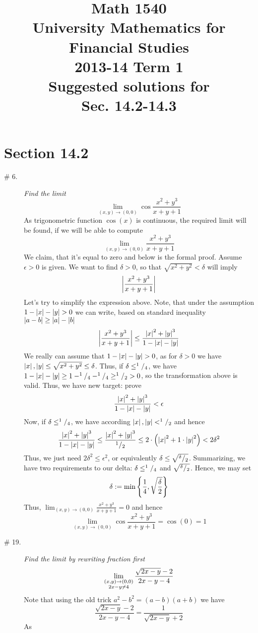 \documentclass[8pt]{article} %
\title{Math 1540\\University Mathematics for Financial Studies\\2013-14 Term 1\\Suggested solutions for\\
Sec. 14.2-14.3}
\begin{document}
\maketitle
\section{Section 14.2}
\begin{description}
	\item[\# 6.]{{\it Find the limit}\[\lim_{(x,y)\to(0,0)}\cos\frac{x^2+y^3}{x+y+1}\]
		}
		As trigonometric function $\cos(x)$ is continuous, the required limit will be found, if we will be able to compute
		\[\lim_{(x,y)\to(0,0)}\frac{x^2+y^3}{x+y+1}\]
		We claim, that it's equal to zero and below is the formal proof. Assume $\epsilon>0$ is given. We want to find $
		\delta>0$, so that $\sqrt{x^2+y^2}<\delta$ will imply
		\[\left|\frac{x^2+y^3}{x+y+1}\right|\]
		Let's try to simplify the expression above. Note, that under the assumption $1-\myabs{x}-\myabs{y}>0$ we can write,
		based on standard inequality $\left|a-b\right|\geq\left|a\right|-\left|b\right|$
		\[\left|\frac{x^2+y^3}{x+y+1}\right|\leq\frac{\left|x\right|^2+\left|y\right|^3}{1-\left|x\right|-\left|y\right|}\]
		We really can assume that $1-\myabs{x}-\myabs{y}>0$, as for $\delta>0$ we have $\left|x\right|,\left|y\right|\leq\sqrt{x^2+
		y^2}\leq\delta$. Thus, if $\delta\leq^{1}/_{4}$, we have $1-\left|x\right|-\left|y\right|\geq 1-^{1}/_{4}-^{1}/_{4}
		\geq^{1}/_{2}>0$, so the transformation above is valid. Thus, we have new target: prove
		\[\frac{\left|x\right|^2+\left|y\right|^3}{1-\left|x\right|-\left|y\right|}<\epsilon\]
		Now, if $\delta\leq^{1}/_{4}$, we have according $\left|x\right|,\left|y\right|<^{1}/_{2}$ and hence
		\[\frac{\left|x\right|^2+\left|y\right|^3}{1-\left|x\right|-\left|y\right|}\leq
		\frac{\left|x\right|^2+\left|y\right|^3}{^{1}/_{2}}\leq2\cdot\left(\left|x\right|^2+1\cdot\left|y\right|^2\right)<2\delta^2\]
		Thus, we just need $2\delta^2\leq\epsilon^2$, or equivalently $\delta\leq\sqrt{^{\delta}/_{2}}$. Summarizing,
		we have two requirements to our delta: $\delta\leq^{1}/_{4}$ and $\sqrt{^{\delta}/_{2}}$. Hence, we may set
		\[\delta:=\min\mycbra{\frac{1}{4},\sqrt{\frac{\delta}{2}}}\]
		Thus, $\lim_{(x,y)\to(0,0)}\frac{x^2+y^3}{x+y+1}=0$ and hence
		\[\lim_{(x,y)\to(0,0)}\cos\frac{x^2+y^3}{x+y+1}=\cos(0)=1\]
	\item[\# 19.]{{\it Find the limit by rewriting fraction first}
		\[\lim_{\begin{subarray}{c}(x,y)\to(0,0)\\2x-y\neq4\end{subarray}}\frac{\sqrt{2x-y}-2}{2x-y-4}\]
		Note that using the old trick $a^2-b^2=(a-b)(a+b)$ we have
		\[\frac{\sqrt{2x-y}-2}{2x-y-4}=\frac{1}{\sqrt{2x-y}+2}\]
		As 
		}
\end{description}
\end{document}
